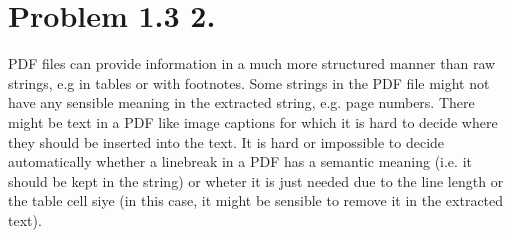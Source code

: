 \documentclass{article}
\begin{document}
\section*{Problem 1.3 2.}
PDF files can provide information in a much more structured manner than raw strings, e.g in tables or with footnotes.
Some strings in the PDF file might not have any sensible meaning in the extracted string, e.g. page numbers.
There might be text in a PDF like image captions for which it is hard to decide where they should be inserted into the text.
It is hard or impossible to decide automatically whether a linebreak in a PDF has a semantic meaning
(i.e. it should be kept in the string)
or wheter it is just needed due to the line length or the table cell siye (in this case, it might be sensible to remove it in the extracted text).
\end{document}
